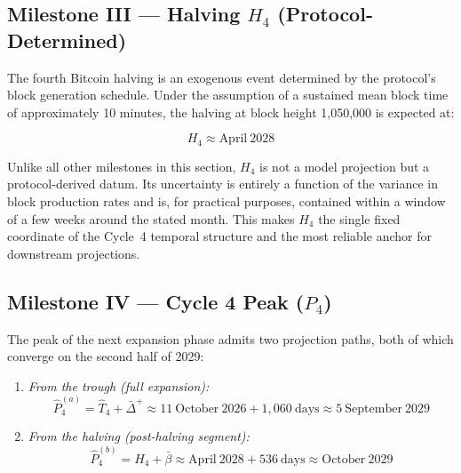 \subsection{Milestone III --- Halving $H_4$ (Protocol-Determined)}

The fourth Bitcoin halving is an exogenous event determined by the protocol's
block generation schedule. Under the assumption of a sustained mean block time
of approximately 10 minutes, the halving at block height 1{,}050{,}000 is
expected at:

\begin{equation}
  H_4 \approx \text{April}\ 2028
  \label{eq:h4}
\end{equation}

Unlike all other milestones in this section, $H_4$ is not a model projection
but a protocol-derived datum. Its uncertainty is entirely a function of the
variance in block production rates and is, for practical purposes, contained
within a window of a few weeks around the stated month. This makes $H_4$ the
single fixed coordinate of the Cycle~4 temporal structure and the most reliable
anchor for downstream projections.

\subsection{Milestone IV --- Cycle 4 Peak ($P_4$)}

The peak of the next expansion phase admits two projection paths, both of which
converge on the second half of 2029:

\begin{enumerate}
  \item \textit{From the trough (full expansion):}
  \begin{equation}
    \hat{P}_4^{(a)} = \hat{T}_4 + \bar{\Delta}^{+}
                    \approx 11\ \text{October}\ 2026 + 1{,}060\ \text{days}
                    \approx 5\ \text{September}\ 2029
    \label{eq:p4_a}
  \end{equation}

  \item \textit{From the halving (post-halving segment):}
  \begin{equation}
    \hat{P}_4^{(b)} = H_4 + \bar{\beta}
                    \approx \text{April}\ 2028 + 536\ \text{days}
                    \approx \text{October}\ 2029
    \label{eq:p4_b}
  \end{equation}
\end{enumerate}

